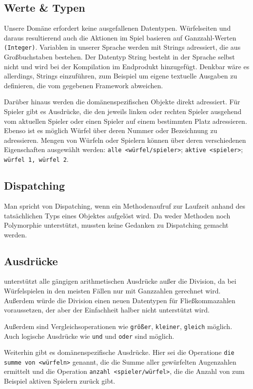 	\subsection{Werte \& Typen}
	\label{sub:werte_typen}
		Unsere Domäne erfordert keine ausgefallenen Datentypen. Würfelseiten und daraus resultierend auch die Aktionen im Spiel basieren auf Ganzzahl-Werten \texttt{(Integer)}. Variablen in unserer Sprache werden mit Strings adressiert, die aus Großbuchstaben bestehen. Der Datentyp String besteht in der Sprache selbst nicht und wird bei der Kompilation im Endprodukt hinzugefügt. Denkbar wäre es allerdings, Strings einzuführen, zum Beispiel um eigene textuelle Ausgaben zu definieren, die vom gegebenen Framework abweichen.

		Darüber hinaus werden die domänenspezifischen Objekte direkt adressiert. Für Spieler gibt es Ausdrücke, die den jeweils linken oder rechten Spieler ausgehend vom aktuellen Spieler oder einen Spieler auf einem bestimmten Platz adressieren. Ebenso ist es möglich Würfel über deren Nummer oder Bezeichnung zu adressieren. Mengen von Würfeln oder Spielern können über deren verschiedenen Eigenschaften ausgewählt werden: \texttt{alle <würfel/spieler>}; \texttt{aktive <spieler>}; \texttt{würfel 1, würfel 2}.

	\subsection{Dispatching}
	\label{sub:dispatching}
		Man spricht von Dispatching, wenn ein Methodenaufruf zur Laufzeit anhand des tatsächlichen Typs eines Objektes aufgelöst wird. Da \dg weder Methoden noch Polymorphie unterstützt, mussten keine Gedanken zu Dispatching gemacht werden.

	\subsection{Ausdrücke}
	\label{sub:ausdrucke}
		\dg unterstützt alle gängigen arithmetischen Ausdrücke außer die Division, da bei Würfelspielen in den meisten Fällen nur mit Ganzzahlen gerechnet wird. Außerdem würde die Division einen neuen Datentypen für Fließkommazahlen voraussetzen, der aber der Einfachheit halber nicht unterstützt wird.

		Außerdem sind Vergleichsoperationen wie \texttt{größer}, \texttt{kleiner}, \texttt{gleich} möglich. Auch logische Ausdrücke wie \texttt{und} und \texttt{oder} sind möglich.

		Weiterhin gibt es domänenspezifische Ausdrücke. Hier sei die Operatione \texttt{die summe von <würfeln>} genannt, die die Summe aller gewürfelten Augenzahlen ermittelt und die Operation \texttt{anzahl <spieler/würfel>}, die die Anzahl von zum Beispiel aktiven Spielern zurück gibt.

